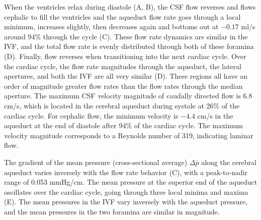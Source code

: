 \documentclass{template}
\begin{document}
When the ventricles relax during diastole (A, B),
the CSF flow reverses and flows cephalic to fill the ventricles
and the aqueduct flow rate goes through a local minimum, increases slightly,
then decreases again and bottoms out at $-0.17$ ml/s around
94\% through the cycle (C).
These flow rate dynamics are similar in the IVF,
and the total flow rate is evenly distributed through both of these foramina
(D).
Finally, flow reverses when transitioning 
into the next cardiac cycle. Over the cardiac cycle,
the flow rate magnitudes through the aqueduct,
the lateral apertures, and both the IVF
are all very similar (D).
These regions all have an order of magnitude greater
flow rates than the flow rates through the median aperture.
The maximum CSF velocity magnitude of caudally directed flow is 6.8 cm/s,
which is located in the cerebral aqueduct during systole at 26\% of the cardiac cycle.
For cephalic flow, the minimum velocity is $-4.4$ cm/s in the aqueduct at the end of diastole
after 94\% of the cardiac cycle. The maximum velocity magnitude corresponds to
a Reynolds number of 319, indicating laminar flow.

The gradient of the mean pressure (cross-sectional average) $\Delta\overline{p}$
along the cerebral aqueduct varies inversely with
the flow rate behavior (C),
with a peak-to-nadir range of 0.053 mmHg/cm. The mean pressure
at the superior end of the aqueduct oscillates over the cardiac cycle,
going through three local minima and maxima (E).
The mean pressures in the IVF vary inversely with the aqueduct pressure, and the
mean pressures in the two foramina are similar in magnitude.
\end{document}
